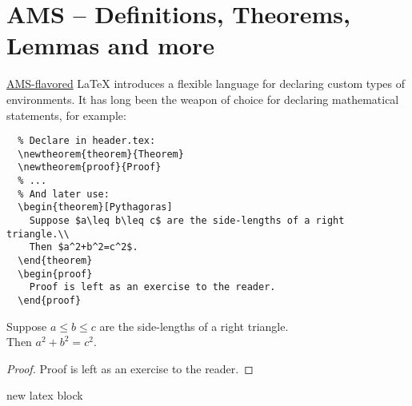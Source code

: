 \section{AMS -- Definitions, Theorems, Lemmas and more}
\href{https://en.wikipedia.org/wiki/AMS-LaTeX}{AMS-flavored} {\LaTeX} introduces a flexible language for declaring custom types of environments. It has long been the weapon of choice for declaring mathematical statements, for example:

\begin{lstlisting}
  % Declare in header.tex:
  \newtheorem{theorem}{Theorem}
  \newtheorem{proof}{Proof}
  % ...
  % And later use:
  \begin{theorem}[Pythagoras] 
    Suppose $a\leq b\leq c$ are the side-lengths of a right triangle.\\  
    Then $a^2+b^2=c^2$.
  \end{theorem}
  \begin{proof}
    Proof is left as an exercise to the reader.
  \end{proof}
\end{lstlisting}

  \begin{theorem}[Pythagoras] 
    Suppose $a\leq b\leq c$ are the side-lengths of a right triangle.\\  
    Then $a^2+b^2=c^2$.
  \end{theorem}
  \begin{proof}
    Proof is left as an exercise to the reader.
  \end{proof}
  new latex block